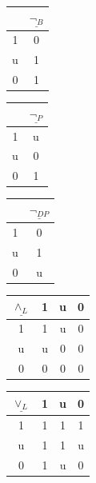 \documentclass[11pt,a4paper,titlepage]{article}
\theoremstyle{definition}
\newcommand{\3}{\vspace{.3in}}
\newcommand{\2}{\vspace{.2in}}
\newcommand{\1}{\vspace{.1in}}
\newcommand{\5}{\vspace{.05in}}
\begin{document}
	\begin{center}
	\begin{tabular}{|c|c|}
		\hline  & $\underline{\neg_B} $\\\hline
		1 & 0\\
		u & 1 \\
		0 & 1 \\\hline
	\end{tabular}
	\begin{tabular}{|c|c|}
		\hline  & $\underline{\neg_P} $\\\hline
		1 & u\\
		u & 0 \\
		0 & 1 \\\hline
	\end{tabular}
	\begin{tabular}{|c|c|}
		\hline  & $\underline{\neg_{\mathit{DP}}} $\\\hline
		1 & 0\\
		u & 1 \\
		0 & u \\\hline
	\end{tabular}
	\begin{tabular}{|c|ccc|}
		\hline
		$\underline{\wedge_L} $ & 1 & u & 0 \\
		\hline
		1 & 1 & u & 0 \\
		u & u & 0 & 0 \\
		0 & 0 & 0 & 0 \\
		\hline
	\end{tabular}
	\begin{tabular}{|c|ccc|}
		\hline
		$\underline{\vee_L} $ & 1 & u & 0 \\
		\hline
		1 & 1 & 1 & 1 \\
		u & 1 & 1 & u \\
		0 & 1 & u & 0 \\
		\hline
	\end{tabular}
\end{center}
\end{document}
